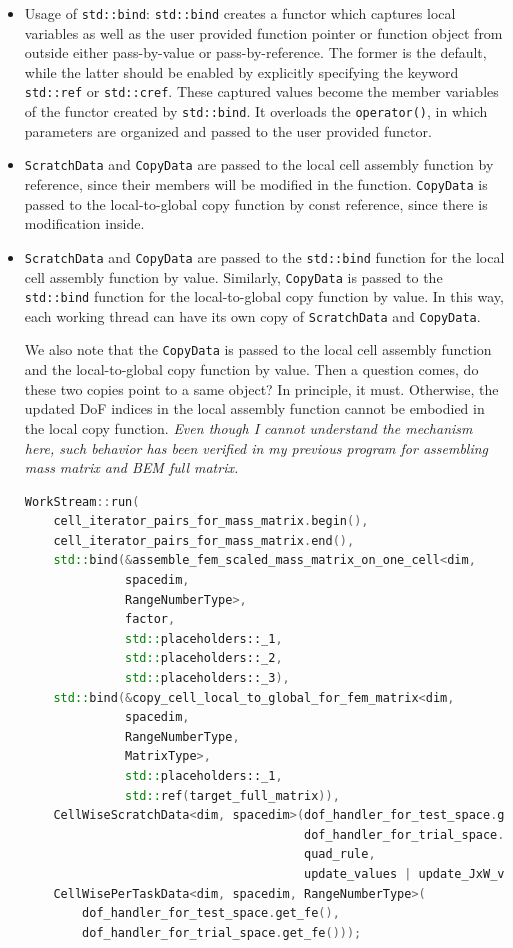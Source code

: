 \documentclass[11pt, a4paper]{book}
\begin{document}
\begin{itemize}
\item Usage of \texttt{std::bind}: \texttt{std::bind} creates a functor which captures local variables as well as the user provided function pointer or function object from outside either pass-by-value or pass-by-reference. The former is the default, while the latter should be enabled by explicitly specifying the keyword \texttt{std::ref} or \texttt{std::cref}. These captured values become the member variables of the functor created by \texttt{std::bind}. It overloads the \texttt{operator()}, in which parameters are organized and passed to the user provided functor.
\item \texttt{ScratchData} and \texttt{CopyData} are passed to the local cell assembly function by reference, since their members will be modified in the function. \texttt{CopyData} is passed to the local-to-global copy function by const reference, since there is modification inside.
\item \texttt{ScratchData} and \texttt{CopyData} are passed to the \texttt{std::bind} function for the local cell assembly function by value. Similarly, \texttt{CopyData} is passed to the \texttt{std::bind} function for the local-to-global copy function by value. In this way, each working thread can have its own copy of \texttt{ScratchData} and \texttt{CopyData}.

We also note that the \texttt{CopyData} is passed to the local cell assembly function and the local-to-global copy function by value. Then a question comes, do these two copies point to a same object? In principle, it must. Otherwise, the updated DoF indices in the local assembly function cannot be embodied in the local copy function. \emph{Even though I cannot understand the mechanism here, such behavior has been verified in my previous program for assembling mass matrix and BEM full matrix.}
\begin{lstlisting}[language=C++]
WorkStream::run(
    cell_iterator_pairs_for_mass_matrix.begin(),
    cell_iterator_pairs_for_mass_matrix.end(),
    std::bind(&assemble_fem_scaled_mass_matrix_on_one_cell<dim,
              spacedim,
              RangeNumberType>,
              factor,
              std::placeholders::_1,
              std::placeholders::_2,
              std::placeholders::_3),
    std::bind(&copy_cell_local_to_global_for_fem_matrix<dim,
              spacedim,
              RangeNumberType,
              MatrixType>,
              std::placeholders::_1,
              std::ref(target_full_matrix)),
    CellWiseScratchData<dim, spacedim>(dof_handler_for_test_space.get_fe(),
                                       dof_handler_for_trial_space.get_fe(),
                                       quad_rule,
                                       update_values | update_JxW_values),
    CellWisePerTaskData<dim, spacedim, RangeNumberType>(
        dof_handler_for_test_space.get_fe(),
        dof_handler_for_trial_space.get_fe()));
\end{lstlisting}
\end{itemize}
\end{document}
